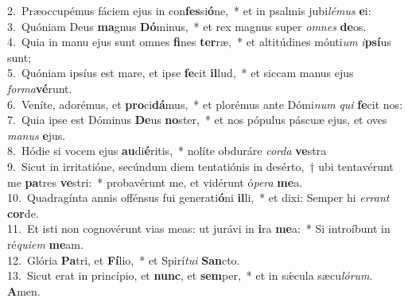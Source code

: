 {2.~}Præoccupémus fáciem ejus in con\textbf{fes}si\textbf{ó}ne,~* et in psalmis jubi\textit{lé}\textit{mus} \textbf{e}i:\\
{3.~}Quóniam Deus \textbf{ma}gnus \textbf{Dó}minus,~* et rex magnus super \textit{om}\textit{nes} \textbf{de}os.\\
{4.~}Quia in manu ejus sunt omnes \textbf{fi}nes \textbf{ter}ræ,~* et altitúdines mónti\textit{um} \textit{i}\textbf{psí}us sunt;\\
{5.~}Quóniam ipsíus est mare, et ipse \textbf{fe}cit \textbf{il}lud,~* et siccam manus ejus \textit{for}\textit{ma}\textbf{vé}runt.\\
{6.~}Veníte, adorémus, et \textbf{pro}ci\textbf{dá}mus,~* et plorémus ante Dómi\textit{num} \textit{qui} \textbf{fe}cit nos:\\
{7.~}Quia ipse est Dóminus \textbf{De}us \textbf{no}ster,~* et nos pópulus páscuæ ejus, et oves \textit{ma}\textit{nus} \textbf{e}jus.\\
{8.~}Hódie si vocem ejus \textbf{au}di\textbf{é}ritis,~* nolíte obduráre \textit{cor}\textit{da} \textbf{ve}stra\\
{9.~}Sicut in irritatióne, secúndum diem tentatiónis in desérto,~† ubi tentavérunt me \textbf{pa}tres \textbf{ve}stri:~* probavérunt me, et vidérunt ó\textit{pe}\textit{ra} \textbf{me}a.\\
{10.~}Quadragínta annis offénsus fui generati\textbf{ó}ni \textbf{il}li,~* et dixi: Semper hi \textit{er}\textit{rant} \textbf{cor}de.\\
{11.~}Et isti non cognovérunt vias meas: ut jurávi in \textbf{i}ra \textbf{me}a:~* Si introíbunt in ré\textit{qui}\textit{em} \textbf{me}am.\\
{12.~}Glória \textbf{Pa}tri, et \textbf{Fí}lio,~* et Spirí\textit{tu}\textit{i} \textbf{San}cto.\\
{13.~}Sicut erat in princípio, et \textbf{nunc}, et \textbf{sem}per,~* et in sǽcula sæcu\textit{ló}\textit{rum}. \textbf{A}men.\\
